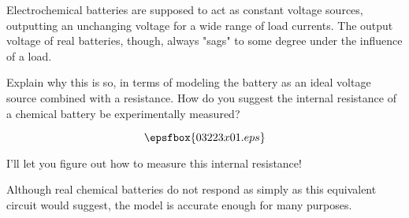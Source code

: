 

Electrochemical batteries are supposed to act as constant voltage sources, outputting an unchanging voltage for a wide range of load currents.  The output voltage of real batteries, though, always "sags" to some degree under the influence of a load.

Explain why this is so, in terms of modeling the battery as an ideal voltage source combined with a resistance.  How do you suggest the internal resistance of a chemical battery be experimentally measured?







$$\epsfbox{03223x01.eps}$$

I'll let you figure out how to measure this internal resistance!







Although real chemical batteries do not respond as simply as this equivalent circuit would suggest, the model is accurate enough for many purposes.




